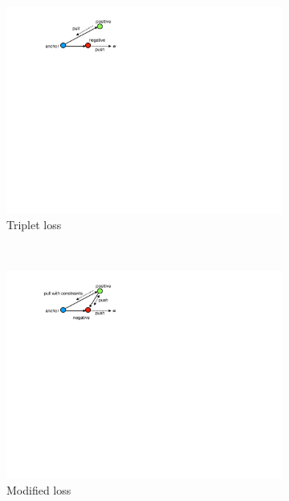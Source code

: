 \begin{figure}[htb]
    \centering
    \begin{subfigure}[t]{0.31\linewidth}
        \centering
        \includegraphics[width=\linewidth]{schroff_triplet}
        \caption{Triplet loss}
        \label{schroff_loss}
    \end{subfigure}%
    ~ 
    \begin{subfigure}[t]{0.31\linewidth}
        \centering 
        \includegraphics[width=\linewidth]{modified_loss}
        \caption{Modified loss}
        \label{modified_loss}
    \end{subfigure}
    ~ 
    \begin{subfigure}[t]{0.31\linewidth}
        \centering 

\end{subfigure}
\end{figure}
